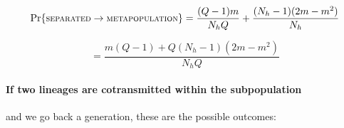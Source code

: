 \documentclass[_main.tex]{subfiles}
\begin{document}
\begin{equation*}
\Pr \{ \textsc{\small{separated}} \rightarrow \textsc{\small{metapopulation}} \} 
= \frac{(Q -1)m}{N_h Q} + \frac{(N_h-1)(2m - m^2)}{N_h}
\end{equation*}

\begin{equation*}
= \frac{m(Q-1) + Q (N_h-1)(2m - m^2)}{N_h Q}
\end{equation*}


\paragraph{If two lineages are cotransmitted within the subpopulation} and we go back a generation, these are the possible outcomes:
\end{document}
